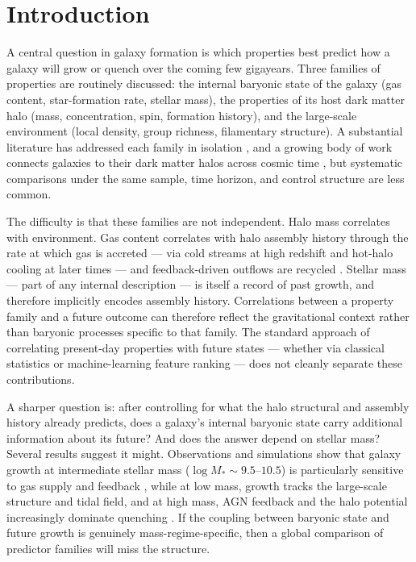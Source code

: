 \documentclass[twocolumn,linenumbers]{aastex701}
\newcommand{\logM}{\log M_*}
\begin{document}

\section{\textbf{Introduction}}
\label{sec:intro}

A central question in galaxy formation is which properties best predict how
a galaxy will grow or quench over the coming few gigayears.
Three families of properties are routinely discussed: the internal baryonic
state of the galaxy (gas content, star-formation rate, stellar mass), the
properties of its host dark matter halo (mass, concentration, spin,
formation history), and the large-scale environment (local density, group
richness, filamentary structure).
A substantial literature has addressed each family in isolation
\citep[e.g.,][]{dave2012,wetzel2013,behroozi2019,moster2013,peng2010},
and a growing body of work connects galaxies to their dark matter halos
across cosmic time \citep{wechsler2018,gao2005,wechsler2006,mao2018},
but systematic comparisons under the same sample, time horizon, and
control structure are less common.

The difficulty is that these families are not independent.
Halo mass correlates with environment.
Gas content correlates with halo assembly history through the rate at which
gas is accreted --- via cold streams at high redshift and hot-halo cooling
at later times \citep{dekel2009} --- and feedback-driven outflows are
recycled \citep{bouche2010,lilly2013}.
Stellar mass --- part of any internal description --- is itself a record of
past growth, and therefore implicitly encodes assembly history.
Correlations between a property family and a future outcome can therefore
reflect the gravitational context rather than baryonic processes specific to
that family.
The standard approach of correlating present-day properties with future
states --- whether via classical statistics or machine-learning feature
ranking \citep[e.g.,][]{bluck2022,davies2019,teimoorinia2016,lovell2019,matthee2019}
--- does not cleanly separate these contributions.

A sharper question is: after controlling for what the halo structural and
assembly history already predicts, does a galaxy's internal baryonic state
carry additional information about its future?
And does the answer depend on stellar mass?
Several results suggest it might.
Observations and simulations show that galaxy growth at intermediate stellar
mass ($\logM \sim 9.5$--$10.5$) is particularly sensitive to gas supply
and feedback \citep{dave2012,pillepich2018gas,saintonge2017}, while at low
mass, growth tracks the large-scale structure and tidal field, and at high
mass, AGN feedback and the halo potential increasingly dominate quenching
\citep{croton2006,weinberger2018,peng2010}.
If the coupling between baryonic state and future growth is genuinely
mass-regime-specific, then a global comparison of predictor families will
miss the structure.
\end{document}
